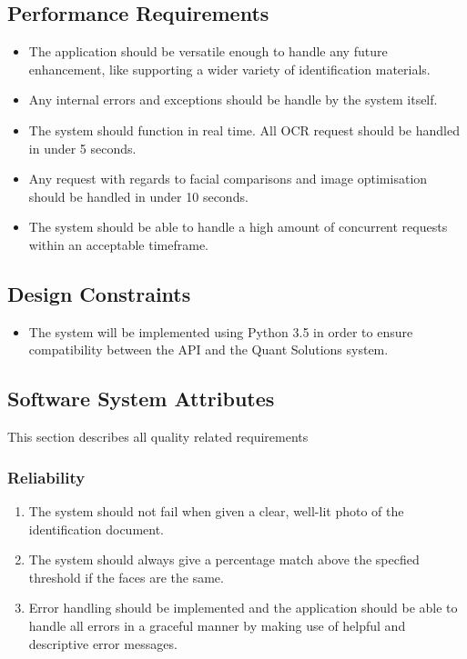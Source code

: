 \documentclass{article}
\begin{document}
		\subsection{Performance Requirements}\label{subsec:specific-performance}
		\begin{itemize}
		    \item The application should be versatile enough to handle any future enhancement, like supporting a wider variety of identification materials.
		    \item Any internal errors and exceptions should be handle by the system itself.
		    \item The system should function in real time. All OCR request should be handled in under 5 seconds.
		    \item Any request with regards to facial comparisons and image optimisation should be handled in under 10 seconds.
		    \item The system should be able to handle a high amount of concurrent requests within an acceptable timeframe.
		\end{itemize}

		\subsection{Design Constraints}\label{subsec:specific-constraints}
		\begin{itemize}
		    \item The system will be implemented using Python 3.5 in order to ensure compatibility between the API and the Quant Solutions system.
		\end{itemize}

		\subsection{Software System Attributes}\label{subsec:specific-software}
		This section describes all quality related requirements
		\subsubsection{Reliability}
		\begin{enumerate}
		    \item The system should not fail when given a clear, well-lit photo of the identification document.
		    \item The system should always give a percentage match above the specfied threshold if the faces are the same.
		    \item Error handling should be implemented and the application should be able to handle all errors in a graceful manner by making use of helpful and descriptive error messages.
		\end{enumerate}
\end{document}
